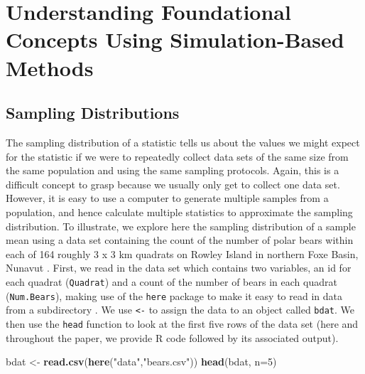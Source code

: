 \documentclass[fleqn,10pt]{wlpeerj} %
\newenvironment{Shaded}{\begin{snugshade}}{\end{snugshade}}
\newcommand{\DataTypeTok}[1]{\textcolor[rgb]{0.13,0.29,0.53}{#1}}
\newcommand{\DecValTok}[1]{\textcolor[rgb]{0.00,0.00,0.81}{#1}}
\newcommand{\KeywordTok}[1]{\textcolor[rgb]{0.13,0.29,0.53}{\textbf{#1}}}
\newcommand{\NormalTok}[1]{#1}
\newcommand{\StringTok}[1]{\textcolor[rgb]{0.31,0.60,0.02}{#1}}
\begin{document}
\hypertarget{understanding-foundational-concepts-using-simulation-based-methods}{%
\section*{Understanding Foundational Concepts Using Simulation-Based Methods}\label{understanding-foundational-concepts-using-simulation-based-methods}}

\hypertarget{sampling-distributions}{%
\subsection*{Sampling Distributions}\label{sampling-distributions}}

The sampling distribution of a statistic tells us about the values we might expect for the statistic if we were to repeatedly collect data sets of the same size from the same population and using the same sampling protocols. Again, this is a difficult concept to grasp because we usually only get to collect one data set.
However, it is easy to use a computer to generate multiple samples from a population, and hence calculate multiple statistics to approximate the sampling distribution. To illustrate, we explore here the sampling distribution of a sample mean using a data set containing the count of the number of polar bears within each of 164 roughly 3 x 3 km quadrats on Rowley Island in northern Foxe Basin, Nunavut \citep[Fig. 1A,][]{Stapleton2014}. First, we read in the data set which contains two variables, an id for each quadrat (\texttt{Quadrat}) and a count of the number of bears in each quadrat (\texttt{Num.Bears}), making use of the \texttt{here} package to make it easy to read in data from a subdirectory \citep{here}. We use \texttt{\textless{}-} to assign the data to an object called \texttt{bdat}. We then use the \texttt{head} function to look at the first five rows of the data set (here and throughout the paper, we provide R code followed by its associated output).

\begin{Shaded}
\begin{Highlighting}[]
\NormalTok{bdat <-}\StringTok{ }\KeywordTok{read.csv}\NormalTok{(}\KeywordTok{here}\NormalTok{(}\StringTok{"data"}\NormalTok{,}\StringTok{"bears.csv"}\NormalTok{))}
\KeywordTok{head}\NormalTok{(bdat, }\DataTypeTok{n=}\DecValTok{5}\NormalTok{)}
\end{Highlighting}
\end{Shaded}
\end{document}
